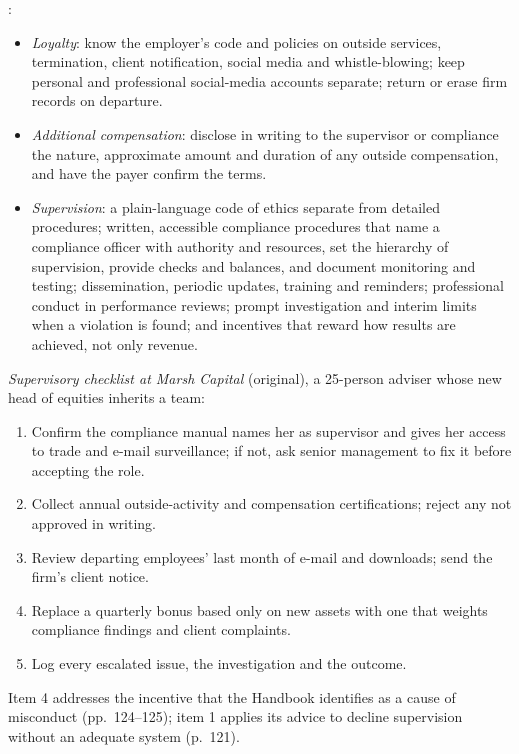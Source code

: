 \begin{qfmethod}\label{meth:preventing-employer-duty-violations}
 \citep[pp.~111, 117--118, 122--125]{standards-practice-handbook-2024}:
\begin{itemize}
\item \emph{Loyalty}: know the employer's code and policies on outside services, termination, client notification, social media and whistle-blowing; keep personal and professional social-media accounts separate; return or erase firm records on departure.
\item \emph{Additional compensation}: disclose in writing to the supervisor or compliance the nature, approximate amount and duration of any outside compensation, and have the payer confirm the terms.
\item \emph{Supervision}: a plain-language code of ethics separate from detailed procedures; written, accessible compliance procedures that name a compliance officer with authority and resources, set the hierarchy of supervision, provide checks and balances, and document monitoring and testing; dissemination, periodic updates, training and reminders; professional conduct in performance reviews; prompt investigation and interim limits when a violation is found; and incentives that reward how results are achieved, not only revenue.
\end{itemize}

 \emph{Supervisory checklist at Marsh Capital} (original), a 25-person adviser whose new head of equities inherits a team:
\begin{enumerate}
\item Confirm the compliance manual names her as supervisor and gives her access to trade and e-mail surveillance; if not, ask senior management to fix it before accepting the role.
\item Collect annual outside-activity and compensation certifications; reject any not approved in writing.
\item Review departing employees' last month of e-mail and downloads; send the firm's client notice.
\item Replace a quarterly bonus based only on new assets with one that weights compliance findings and client complaints.
\item Log every escalated issue, the investigation and the outcome.
\end{enumerate}
Item 4 addresses the incentive that the Handbook identifies as a cause of misconduct (pp.~124--125); item 1 applies its advice to decline supervision without an adequate system (p.~121).


\end{qfmethod}

